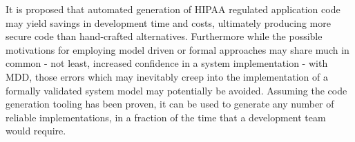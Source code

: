It is proposed that automated generation of HIPAA regulated application code may yield savings in development time and costs, ultimately producing more secure code than hand-crafted alternatives. Furthermore while the possible motivations for employing model driven or formal approaches may share much in common - not least, increased confidence in a system implementation - with MDD, those errors which may inevitably creep into the implementation of a formally validated system model may potentially be avoided. Assuming the code generation tooling has been proven, it can be used to generate any number of reliable implementations, in a fraction of the time that a development team would require.


